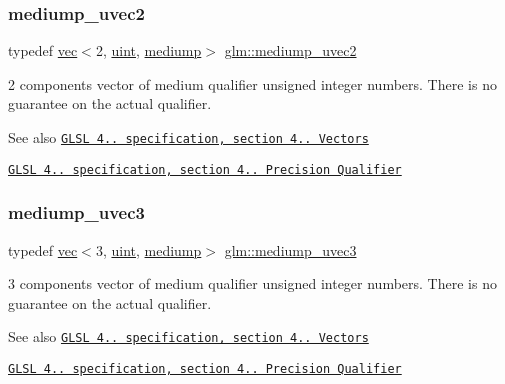 \subsubsection{\texorpdfstring{mediump\+\_\+uvec2}{mediump\_uvec2}}
{\footnotesize\ttfamily typedef \hyperlink{structglm_1_1vec}{vec}$<$2, \hyperlink{group__core__precision_ga4fd29415871152bfb5abd588334147c8}{uint}, \hyperlink{namespaceglm_a36ed105b07c7746804d7fdc7cc90ff25a6416f3ea0c9025fb21ed50c4d6620482}{mediump}$>$ \hyperlink{group__core__precision_ga35052256be4d47b9cb80114ca043cfaf}{glm\+::mediump\+\_\+uvec2}}

2 components vector of medium qualifier unsigned integer numbers. There is no guarantee on the actual qualifier.

\begin{DoxySeeAlso}{See also}
\href{http://www.opengl.org/registry/doc/GLSLangSpec.4.20.8.pdf}{\tt G\+L\+SL 4.. specification, section 4.. Vectors} 

\href{http://www.opengl.org/registry/doc/GLSLangSpec.4.20.8.pdf}{\tt G\+L\+SL 4.. specification, section 4.. Precision Qualifier} 
\end{DoxySeeAlso}
\mbox{\label{group__core__precision_ga0eaf34ab9ebc5e2c92cd6d6d5aa272f4}} 
\subsubsection{\texorpdfstring{mediump\+\_\+uvec3}{mediump\_uvec3}}
{\footnotesize\ttfamily typedef \hyperlink{structglm_1_1vec}{vec}$<$3, \hyperlink{group__core__precision_ga4fd29415871152bfb5abd588334147c8}{uint}, \hyperlink{namespaceglm_a36ed105b07c7746804d7fdc7cc90ff25a6416f3ea0c9025fb21ed50c4d6620482}{mediump}$>$ \hyperlink{group__core__precision_ga0eaf34ab9ebc5e2c92cd6d6d5aa272f4}{glm\+::mediump\+\_\+uvec3}}

3 components vector of medium qualifier unsigned integer numbers. There is no guarantee on the actual qualifier.

\begin{DoxySeeAlso}{See also}
\href{http://www.opengl.org/registry/doc/GLSLangSpec.4.20.8.pdf}{\tt G\+L\+SL 4.. specification, section 4.. Vectors} 

\href{http://www.opengl.org/registry/doc/GLSLangSpec.4.20.8.pdf}{\tt G\+L\+SL 4.. specification, section 4.. Precision Qualifier} 
\end{DoxySeeAlso}
\mbox{\label{group__core__precision_ga204494f26e258e26882acf5288415ebd}} 

